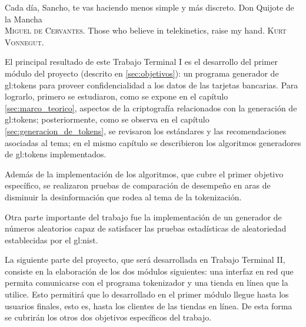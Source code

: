 %
%

{
  \epigrafe
  {%
    Cada día, Sancho, te vas haciendo menos simple y más discreto.%
  }
  {%
    Don Quijote de la Mancha \\
    \textsc{Miguel de Cervantes}.%
  }
  \epigrafe
  {%
    Those who believe in telekinetics, raise my hand.%
  }
  {%
    \textsc{Kurt Vonnegut}.%
  }
}

\noindent

El principal resultado de este Trabajo Terminal I es el desarrollo del primer
módulo del proyecto (descrito en \ref{sec:objetivos}): un programa generador de
\glspl{gl:token} para proveer confidencialidad a los datos de las tarjetas
bancarias. Para lograrlo, primero se estudiaron, como se expone en el capítulo
\ref{sec:marco_teorico}, aspectos de la criptografía relacionados con la
generación de \glspl{gl:token}; posteriormente, como se observa en el capítulo
\ref{sec:generacion_de_tokens}, se revisaron los estándares y las
recomendaciones asociadas al tema; en el mismo capítulo se describieron los
algoritmos generadores de \glspl{gl:token} implementados.

Además de la implementación de los algoritmos, que cubre el primer objetivo
específico, se realizaron pruebas de comparación de desempeño en aras de
disminuir la desinformación que rodea al tema de la tokenización.

Otra parte importante del trabajo fue la implementación de un generador de
números aleatorios capaz de satisfacer las pruebas estadísticas de aleatoriedad
establecidas por el \gls{gl:nist}\footnotemark.


La siguiente parte del proyecto, que será desarrollada en Trabajo Terminal II,
consiste en la elaboración de los dos módulos siguientes: una interfaz en red
que permita comunicarse con el programa tokenizador y una tienda en línea que la
utilice. Esto permitirá que lo desarrollado en el primer módulo llegue hasta los
usuarios finales, esto es, hasta los clientes de las tiendas en línea.
De esta forma se cubrirán los otros dos objetivos específicos del trabajo.
